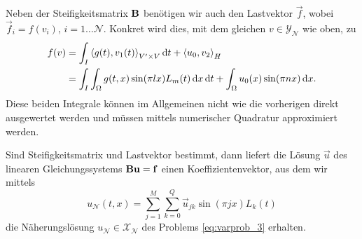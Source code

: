
Neben der Steifigkeitsmatrix $\mathbf{B}$ benötigen wir auch den Lastvektor $\vec f$, wobei $\vec f_{i} = f(v_{i})$, $i = 1 \dots \mathcal N$.
Konkret wird dies, mit dem gleichen $v \in \mathcal Y_{\mathcal N}$ wie oben, zu
\begin{align}
    f(v)
    &= \int_{I} \left\langle g(t),v_{1}(t)\right\rangle_{V' \times V} \mathop{}\!\mathrm{d} t + \left\langle u_{0},v_{2}\right\rangle_{H}
    \\&= \int_{I} \int_{\Omega} g(t, x) \sin(\pi l x) L_{m}(t) \mathop{}\!\mathrm{d} x \mathop{}\!\mathrm{d} t + \int_{\Omega} u_{0}(x) \sin(\pi n x) \mathop{}\!\mathrm{d} x.
\end{align}
Diese beiden Integrale können im Allgemeinen nicht wie die vorherigen direkt ausgewertet werden und müssen mittels numerischer Quadratur approximiert werden.

Sind Steifigkeitsmatrix und Lastvektor bestimmt, dann liefert die Lösung $\vec u$ des linearen Gleichungssystems $\mathbf{B} \mathbf{u} = \mathbf{f}$ einen Koeffizientenvektor, aus dem wir mittels
\begin{equation}
    u_{\mathcal N}(t, x) = \sum_{j = 1}^{M} \sum_{k = 0}^{Q} \vec u_{jk} \sin(\pi j x) L_{k}(t)
\end{equation}
die Näherungslösung $u_{\mathcal N} \in \mathcal X_{\mathcal N}$ des Problems \eqref{eq:varprob_3} erhalten.

